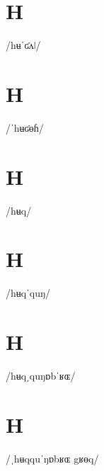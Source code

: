\documentclass[10pt,a4paper,twoside]{book}
\begin{document}
\section*{H}

\begin{multicols}{3}
 {/hʉˈʛʌǀ/} {}
\end{multicols}

\section*{H}

\begin{multicols}{3}
 {/ˈhʉʛɵɦ/} {}
\end{multicols}

\section*{H}

\begin{multicols}{3}
 {/hʉq/} {}
\end{multicols}

\section*{H}

\begin{multicols}{3}
 {/hʉqˈquŋ/} {}
\end{multicols}

\section*{H}

\begin{multicols}{3}
 {/hʉqˌquŋɒbˈʁɶ/} {}
\end{multicols}

\section*{H}

\begin{multicols}{3}
 {/ˌhʉqquˈŋɒbʁɶ gʁɵq/} {}
\end{multicols}
\end{document}
